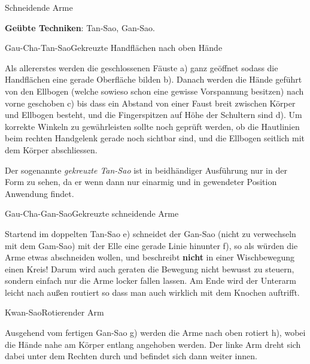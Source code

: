 \begin{WTSatz}{Schneidende Arme}%

\textbf{Ge\"ubte Techniken}: Tan-Sao, Gan-Sao.

	\begin{WTSatzTeil}{Gau-Cha-Tan-Sao}{Gekreuzte Handfl\"achen nach oben H\"ande}
		
		Als allererstes werden die geschlossenen F\"auste a) ganz ge\"offnet sodass die Handfl\"achen eine gerade Oberfl\"ache bilden b). Danach werden die H\"ande gef\"uhrt von den Ellbogen (welche sowieso schon eine gewisse Vorspannung besitzen) nach vorne geschoben c) bis dass ein Abstand von einer Faust breit zwischen K\"orper und Ellbogen besteht, und die Fingerspitzen auf H\"ohe der Schultern sind d). Um korrekte Winkeln zu gew\"ahrleisten sollte noch gepr\"uft werden, ob die Hautlinien beim rechten Handgelenk gerade noch sichtbar sind, und die Ellbogen seitlich mit dem K\"orper abschliessen.
		
		Der sogenannte \textit{gekreuzte Tan-Sao} ist in beidh\"andiger Ausf\"uhrung nur in der Form zu sehen, da er wenn dann nur einarmig und in gewendeter Position Anwendung findet.
	\end{WTSatzTeil}
	
	\begin{WTSatzTeil}{Gau-Cha-Gan-Sao}{Gekreuzte schneidende Arme}
		
		Startend im doppelten Tan-Sao e) schneidet der Gan-Sao (nicht zu verwechseln mit dem Gam-Sao) mit der Elle eine gerade Linie hinunter f), so als w\"urden die Arme etwas abschneiden wollen, und beschreibt \textbf{nicht} in einer Wischbewegung einen Kreis! Darum wird auch geraten die Bewegung nicht bewusst zu steuern, sondern einfach nur die Arme locker fallen lassen. Am Ende wird der Unterarm leicht nach au{\ss}en routiert so dass man auch wirklich mit dem Knochen auftrifft.
	\end{WTSatzTeil}
	
	\begin{WTSatzTeil}{Kwan-Sao}{Rotierender Arm}
		
		Ausgehend vom fertigen Gan-Sao g) werden die Arme nach oben rotiert h), wobei die H\"ande nahe am K\"orper entlang angehoben werden. Der linke Arm dreht sich dabei unter dem Rechten durch und befindet sich dann weiter innen.
		

\end{WTSatzTeil}
\end{WTSatz}
